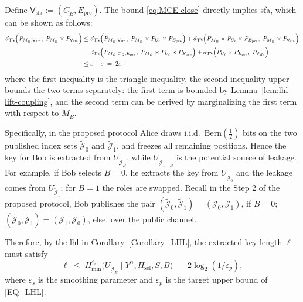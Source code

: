 \documentclass[onecolumn]{IEEEtran} %
\newcommand{\1}{\mathbbm{1}}
\theoremstyle{boldremark}
\begin{document}
Define $\mathsf V_{\mathrm{sfa}}:=(C_{\bar B},E_{\mathrm{pre}})$. The bound \eqref{eq:MCE-close} directly implies \gls{sfa}, which can be shown as follows:
\begin{align}
d_{\mathrm{TV}}\!\Big(P_{M_{\bar B},\mathsf V_{\mathrm{sfa}}},\; P_{M_{\bar B}}\times P_{\mathsf V_{\mathrm{sfa}}}\Big)
&\le
d_{\mathrm{TV}}\!\Big(P_{M_{\bar B},\mathsf V_{\mathrm{sfa}}},\; P_{M_{\bar B}}\times P_{U_\ell}\times P_{E_{\mathrm{pre}}}\Big)
+
d_{\mathrm{TV}}\!\Big(P_{M_{\bar B}}\times P_{U_\ell}\times P_{E_{\mathrm{pre}}},\; P_{M_{\bar B}}\times P_{\mathsf V_{\mathrm{sfa}}}\Big)\notag\\
&=
d_{\mathrm{TV}}\!\Big(P_{M_{\bar B},C_{\bar B},E_{\mathrm{pre}}},\; P_{M_{\bar B}}\times P_{U_\ell}\times P_{E_{\mathrm{pre}}}\Big)
+
d_{\mathrm{TV}}\!\Big(P_{U_\ell}\times P_{E_{\mathrm{pre}}},\; P_{\mathsf V_{\mathrm{sfa}}}\Big)\notag\\
&\le \varepsilon+\varepsilon
\;=\;2\varepsilon,
\label{eq:SFA-from-LHL}
\end{align}
where the first inequality is the triangle inequality, the second inequality upper-bounds the two terms separately: the first term is bounded by Lemma~\ref{lem:lhl-lift-coupling}, and the second term can be derived by marginalizing the first term with respect to $M_{\bar B}$.


Specifically, in the proposed protocol Alice draws i.i.d.\ $\mathrm{Bern}(\tfrac12)$ bits on the two published index sets
$\tilde{\mathcal J}_0$ and $\tilde{\mathcal J}_1$, and freezes all remaining positions. Hence the key for Bob is extracted from
$U_{\tilde{\mathcal J}_B}$, while $U_{\tilde{\mathcal J}_{1-B}}$ is the potential source of leakage.
For example, if Bob selects $B=0$, he extracts the key from $U_{\tilde{\mathcal J}_0}$ and the leakage comes from $U_{\tilde{\mathcal J}_1}$;
for $B=1$ the roles are swapped. Recall in the Step 2 of the proposed protocol, Bob publishes the pair $(\tilde{\mathcal{J}}_{0},\tilde{\mathcal{J}}_{1})=(\mathcal{J}_{0},\mathcal{J}_{1})$, if $B=0$; $(\tilde{\mathcal{J}}_{0},\tilde{\mathcal{J}}_{1})=(\mathcal{J}_{1},\mathcal{J}_{0})$, else, over the public channel.

Therefore, by the \gls{lhl} in Corollary~\ref{Corollary_LHL}, the extracted key length $\ell$ must satisfy
\begin{equation}\label{eq:lhl-design-rule}
\ell
\;\le\;
H_{\min}^{\varepsilon_s}\!\bigl(U_{\tilde{\mathcal J}_{\bar{B}}}\mid Y^n,\Pi_{\mathrm{sel}},S,B\bigr)
\;-\;
2\log_2(1/\varepsilon_p),
\end{equation}
where $\varepsilon_s$ is the smoothing parameter and $\varepsilon_p$ is the target upper bound of \eqref{EQ_LHL}.
\end{document}

